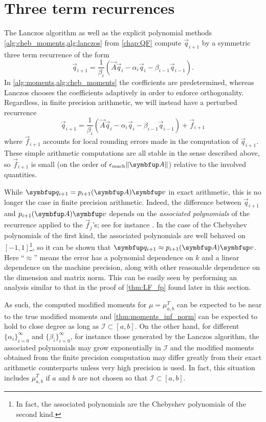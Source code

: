 \section{Three term recurrences}

The Lanczos algorithm as well as the explicit polynomial methods \cref{alg:cheb_moments,alg:lanczos} from \cref{chap:QF} compute \( \vec{q}_{i+1} \) by a symmetric three term recurrence of the form
\begin{equation*}
    \vec{q}_{i+1} = \frac{1}{\beta_{i}} \left( \vec{A} \vec{q}_i - \alpha_i \vec{q}_i - \beta_{i-1} \vec{q}_{i-1}  \right).
\end{equation*}
In \cref{alg:moments,alg:cheb_moments} the coefficients are predetermined, whereas Lanczos chooses the coefficients adaptively in order to enforce orthogonality.
Regardless, in finite precision arithmetic, we will instead have a perturbed recurrence 
\begin{equation*}
    \vec{q}_{i+1} = \frac{1}{\beta_{i}} \left( \vec{A} \vec{q}_i - \alpha_i \vec{q}_i - \beta_{i-1} \vec{q}_{i-1}  \right) + \vec{f}_{i+1}
\end{equation*}
where \( \vec{f}_{i+1} \) accounts for local rounding errors made in the computation of \( \vec{q}_{i+1} \).
These simple arithmetic computations are all stable in the sense described above, so \( \vec{f}_{i+1} \) is small (on the order of \( \epsilon_{\textup{mach}} \|\vec{A}\| \)) relative to the involved quantities.


While \( \vec{q}_{i+1} = p_{i+1}\A \vec{v} \) in exact arithmetic, this is no longer the case in finite precision arithmetic. 
Indeed, the difference between \( \vec{q}_{i+1} \) and \( p_{i+1}\A\vec{v} \) depends on the \emph{associated polynomials} of the recurrence applied to the \( \vec{f}_{j} \)'s; see for instance \cite{meurant_06}.
In the case of the Chebyshev polynomials of the first kind, the associated polynomials are well behaved on \( [-1,1] \)\footnote{In fact, the associated polynomials are the Chebyshev polynomials of the second kind.}, so it can be shown that \( \vec{q}_{i+1} \approx p_{i+1}\A \vec{v} \).
Here ``\(\approx\)'' means the error has a polynomial dependence on \( k \) and a linear dependence on the machine precision, along with other reasonable dependence on the dimension and matrix norm.
This can be easily seen by performing an analysis similar to that in the proof of \cref{thm:LF_fp} found later in this section.

As such, the computed modified moments for \( \mu = \mu_{a,b}^T \) can be expected to be near to the true modified moments and \cref{thm:moments_inf_norm} can be expected to hold to close degree as long as \( \mathcal{I} \subset [a,b] \).
On the other hand, for different \( \{ \alpha_i \}_{i=0}^{\infty} \) and \( \{ \beta_i \}_{i=0}^{\infty} \), for instance those generated by the Lanczos algorithm, the associated polynomials may grow exponentially in \( \mathcal{I}  \) and the modified moments obtained from the finite precision computation may differ greatly from their exact arithmetic counterparts unless very high precision is used.
In fact, this situation includes \( \mu_{a,b}^T \) if \( a \) and \( b \) are not chosen so that \( \mathcal{I} \subset [a,b] \).

